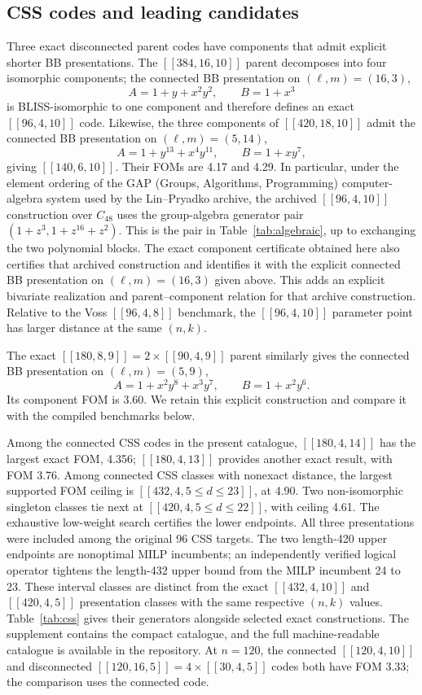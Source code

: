 \documentclass[aps,prx,twocolumn,superscriptaddress,nofootinbib,floatfix]{revtex4-2}
\newcommand{\code}[1]{\ensuremath{\left[\!\left[#1\right]\!\right]}}
\begin{document}
\subsection{CSS codes and leading candidates}
\label{sec:css-results}

Three exact disconnected parent codes have components that admit explicit
shorter BB presentations.  The
$\code{384,16,10}$ parent decomposes into four isomorphic components; the
connected BB presentation on $(\ell,m)=(16,3)$,
\[
 A=1+y+x^2y^2,\qquad B=1+x^3
\]
is BLISS-isomorphic to one component and therefore defines an exact
$\code{96,4,10}$ code.  Likewise, the three components of
$\code{420,18,10}$ admit the connected BB presentation on
$(\ell,m)=(5,14)$,
\[
 A=1+y^{13}+x^4y^{11},\qquad B=1+xy^7,
\]
giving $\code{140,6,10}$.  Their FOMs are 4.17 and 4.29.  In particular,
under the element ordering of the GAP (Groups, Algorithms, Programming)
computer-algebra system used by the Lin--Pryadko archive, the archived
$\code{96,4,10}$ construction over $C_{48}$ uses the group-algebra generator
pair $(1+z^3,1+z^{16}+z^2)$.  This is the pair in
Table~\ref{tab:algebraic}, up to exchanging the two polynomial blocks.  The
exact component certificate obtained here also certifies that archived
construction and identifies it with the explicit connected BB presentation on
$(\ell,m)=(16,3)$ given above.  This adds an explicit bivariate realization and
parent--component relation for that archive construction.
Relative to the Voss $\code{96,4,8}$ benchmark, the
$\code{96,4,10}$ parameter point has larger distance at the same $(n,k)$.

The exact $\code{180,8,9}=2\times\code{90,4,9}$ parent similarly gives the
connected BB presentation on $(\ell,m)=(5,9)$,
\[
 A=1+x^2y^8+x^3y^7,\qquad B=1+x^2y^6.
\]
Its component FOM is 3.60.  We retain this explicit construction and compare
it with the compiled benchmarks below.

Among the connected CSS codes in the present catalogue, $\code{180,4,14}$ has
the largest exact FOM, 4.356; $\code{180,4,13}$ provides another exact result,
with FOM 3.76.  Among connected CSS classes with nonexact distance, the largest
supported FOM ceiling is
$\code{432,4,5{\leq}d{\leq}23}$, at 4.90.  Two non-isomorphic singleton
classes tie next at $\code{420,4,5{\leq}d{\leq}22}$, with ceiling 4.61.  The
exhaustive low-weight search certifies the lower endpoints.  All three presentations were
included among the original 96 CSS targets.  The two length-420 upper endpoints
are nonoptimal MILP incumbents; an independently verified logical operator
tightens the length-432 upper bound from the MILP incumbent 24 to 23.
These interval classes are distinct from the exact $\code{432,4,10}$ and
$\code{420,4,5}$ presentation classes with the same respective $(n,k)$
values.
Table~\ref{tab:css} gives their generators alongside selected exact
constructions.  The supplement contains the compact catalogue, and the full
machine-readable catalogue is available in the repository.  At $n=120$, the connected $\code{120,4,10}$ and disconnected
$\code{120,16,5}=4\times\code{30,4,5}$ codes both have FOM 3.33; the
comparison uses the connected code.
\end{document}
